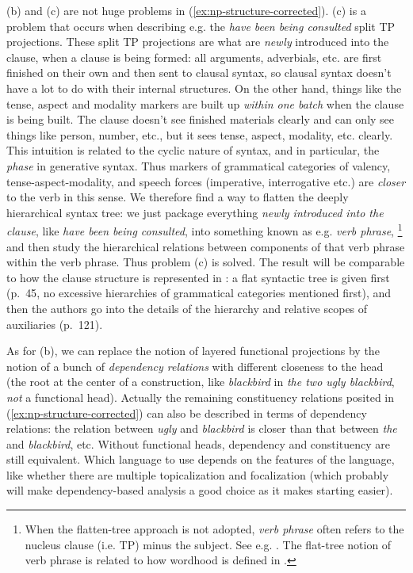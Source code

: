 \documentclass[a4paper, oneside, scheme=plain, 12pt]{article}
\newcommand*{\citepage}[1]{p.~{#1}}
\newcommand*{\term}[1]{\emph{#1}}
\newcommand{\form}[1]{\emph{#1}}
\begin{document}
(b) and (c) are not huge problems in (\ref{ex:np-structure-corrected}).
(c) is a problem that occurs when describing e.g. the \form{have been being consulted} split TP projections.
These split TP projections are what are \emph{newly} introduced into the clause,
when a clause is being formed:
all arguments, adverbials, etc. are first finished on their own 
and then sent to clausal syntax,
so clausal syntax doesn't have a lot to do with their internal structures.
On the other hand, things like the tense, aspect and modality markers are built up \emph{within one batch} when the clause is being built.
The clause doesn't see finished materials clearly and can only see things like person, number, etc.,
but it sees tense, aspect, modality, etc. clearly.
This intuition is related to the cyclic nature of syntax, and in particular, the \emph{phase} in generative syntax.
Thus markers of grammatical categories of valency, tense-aspect-modality, and speech forces (imperative, interrogative etc.)
are \emph{closer} to the verb in this sense.
We therefore find a way to flatten the deeply hierarchical syntax tree:
we just package everything \emph{newly introduced into the clause},
like \form{have been being consulted},
into something known as e.g. \term{verb phrase},%
\footnote{
    When the flatten-tree approach is not adopted,
    \term{verb phrase} often refers to the nucleus clause (i.e. TP) minus the subject.
    See e.g. \citet{cgel}.
    The flat-tree notion of verb phrase is related to how wordhood is defined in .
}
and then study the hierarchical relations between components of that verb phrase
within the verb phrase.
Thus problem (c) is solved.
The result will be comparable to how the clause structure is represented in \citet{quirk2010comprehensive}:
a flat syntactic tree is given first (\citepage{45}, no excessive hierarchies of grammatical categories mentioned first),
and then the authors go into the details of the hierarchy and relative scopes of auxiliaries
(\citepage{121}).

As for (b), we can replace the notion of layered functional projections
by the notion of a bunch of \emph{dependency relations} with different closeness to the head
(the root at the center of a construction, like \form{blackbird} in \form{the two ugly blackbird}, \emph{not} a functional head).
Actually the remaining constituency relations posited in (\ref{ex:np-structure-corrected})
can also be described in terms of dependency relations:
the relation between \form{ugly} and \form{blackbird} is closer than
that between \form{the} and \form{blackbird}, etc.
Without functional heads, dependency and constituency are still equivalent.
Which language to use depends on the features of the language,
like whether there are multiple topicalization and focalization
(which probably will make dependency-based analysis a good choice
as it makes starting easier).
\end{document}
